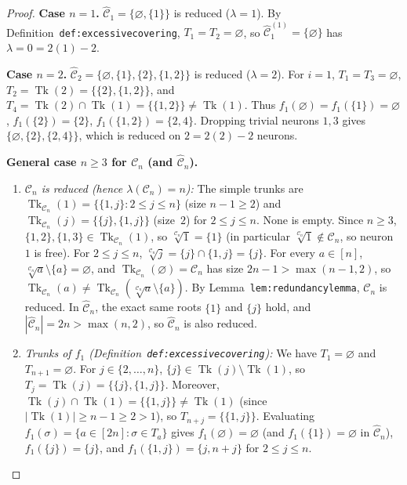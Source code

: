 \documentclass[11pt]{article}
\theoremstyle{plain}
\theoremstyle{definition}
\theoremstyle{remark}
\DeclareMathOperator{\Tk}{Tk}
\begin{document}
\begin{proof}
\textbf{Case $n = 1$.} $\widehat{\mathcal{C}}_1 = \{\varnothing, \{1\}\}$ is reduced ($\lambda = 1$). By Definition~\texttt{def:excessivecovering}, $T_1 = T_2 = \varnothing$, so $\widehat{\mathcal{C}}_1^{(1)} = \{\varnothing\}$ has $\lambda = 0 = 2(1) - 2$.

\medskip
\noindent\textbf{Case $n = 2$.} $\widehat{\mathcal{C}}_2 = \{\varnothing, \{1\}, \{2\}, \{1,2\}\}$ is reduced ($\lambda = 2$). For $i = 1$, $T_1 = T_3 = \varnothing$, $T_2 = \Tk(2) = \{\{2\}, \{1,2\}\}$, and $T_4 = \Tk(2) \cap \Tk(1) = \{\{1,2\}\} \neq \Tk(1)$. Thus $f_1(\varnothing) = f_1(\{1\}) = \varnothing$, $f_1(\{2\}) = \{2\}$, $f_1(\{1,2\}) = \{2,4\}$. Dropping trivial neurons $1,3$ gives $\{\varnothing, \{2\}, \{2,4\}\}$, which is reduced on $2 = 2(2) - 2$ neurons.

\medskip
\noindent\textbf{General case $n \ge 3$ for $\mathcal{C}_n$ (and $\widehat{\mathcal{C}}_n$).}
\begin{enumerate}[label=\textup{(\roman*)}]
\item \emph{$\mathcal{C}_n$ is reduced (hence $\lambda(\mathcal{C}_n) = n$):}
The simple trunks are $\Tk_{\mathcal{C}_n}(1) = \{\{1,j\} : 2 \le j \le n\}$ (size $n - 1 \ge 2$) and $\Tk_{\mathcal{C}_n}(j) = \{\{j\}, \{1,j\}\}$ (size~$2$) for $2 \le j \le n$. None is empty. Since $n \ge 3$, $\{1,2\}, \{1,3\} \in \Tk_{\mathcal{C}_n}(1)$, so $\sqrt[\mathcal{C}_n]{1} = \{1\}$ (in particular $\sqrt[\mathcal{C}_n]{1} \notin \mathcal{C}_n$, so neuron~$1$ is free). For $2 \le j \le n$, $\sqrt[\mathcal{C}_n]{j} = \{j\} \cap \{1,j\} = \{j\}$. For every $a \in [n]$, $\sqrt[\mathcal{C}_n]{a} \setminus \{a\} = \varnothing$, and $\Tk_{\mathcal{C}_n}(\varnothing) = \mathcal{C}_n$ has size $2n - 1 > \max(n-1, 2)$, so $\Tk_{\mathcal{C}_n}(a) \neq \Tk_{\mathcal{C}_n}(\sqrt[\mathcal{C}_n]{a} \setminus \{a\})$. By Lemma~\texttt{lem:redundancylemma}, $\mathcal{C}_n$ is reduced. In $\widehat{\mathcal{C}}_n$, the exact same roots $\{1\}$ and $\{j\}$ hold, and $|\widehat{\mathcal{C}}_n| = 2n > \max(n, 2)$, so $\widehat{\mathcal{C}}_n$ is also reduced.

\item \emph{Trunks of $f_1$ (Definition~\texttt{def:excessivecovering}):}
We have $T_1 = \varnothing$ and $T_{n+1} = \varnothing$. For $j \in \{2, \dots, n\}$, $\{j\} \in \Tk(j) \setminus \Tk(1)$, so $T_j = \Tk(j) = \{\{j\}, \{1,j\}\}$. Moreover, $\Tk(j) \cap \Tk(1) = \{\{1,j\}\} \neq \Tk(1)$ (since $|\Tk(1)| \ge n - 1 \ge 2 > 1$), so $T_{n+j} = \{\{1,j\}\}$. Evaluating $f_1(\sigma) = \{a \in [2n] : \sigma \in T_a\}$ gives $f_1(\varnothing) = \varnothing$ (and $f_1(\{1\}) = \varnothing$ in $\widehat{\mathcal{C}}_n$), $f_1(\{j\}) = \{j\}$, and $f_1(\{1,j\}) = \{j, n+j\}$ for $2 \le j \le n$.


\end{enumerate}
\end{proof}
\end{document}
